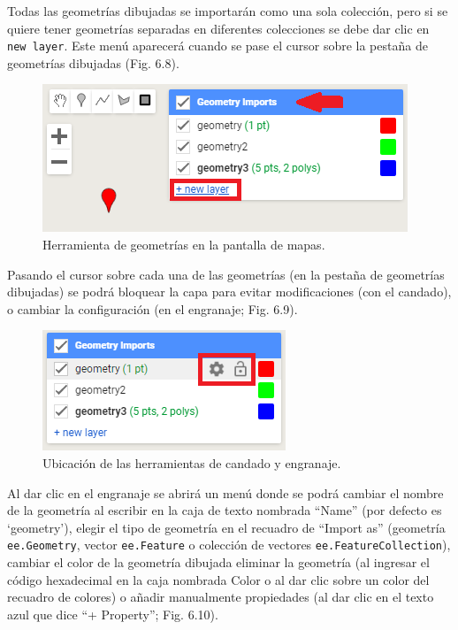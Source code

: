 \documentclass[
  12pt,
  letterpaper,
  twoside]{book}
\begin{document}
Todas las geometrías dibujadas se importarán como una sola colección, pero si se quiere tener geometrías separadas en diferentes colecciones se debe dar clic en \texttt{new\ layer}. Este menú aparecerá cuando se pase el cursor sobre la pestaña de geometrías dibujadas (Fig. 6.8).

\begin{figure}[btp]

{\centering \includegraphics[width=0.6\linewidth]{Img/nuevaGeo} 

}

\caption{Herramienta de geometrías en la pantalla de mapas.}\label{fig:unnamed-chunk-70}
\end{figure}

Pasando el cursor sobre cada una de las geometrías (en la pestaña de geometrías dibujadas) se podrá bloquear la capa para evitar modificaciones (con el candado), o cambiar la configuración (en el engranaje; Fig. 6.9).

\begin{figure}[btp]

{\centering \includegraphics[width=0.4\linewidth]{Img/dibujarGeo} 

}

\caption{Ubicación de las herramientas de candado y engranaje.}\label{fig:unnamed-chunk-71}
\end{figure}

Al dar clic en el engranaje se abrirá un menú donde se podrá cambiar el nombre de la geometría al escribir en la caja de texto nombrada ``Name'' (por defecto es `geometry'), elegir el tipo de geometría en el recuadro de ``Import as'' (geometría \texttt{ee.Geometry}, vector \texttt{ee.Feature} o colección de vectores \texttt{ee.FeatureCollection}), cambiar el color de la geometría dibujada eliminar la geometría (al ingresar el código hexadecimal en la caja nombrada Color o al dar clic sobre un color del recuadro de colores) o añadir manualmente propiedades (al dar clic en el texto azul que dice ``+ Property''; Fig. 6.10).
\end{document}
